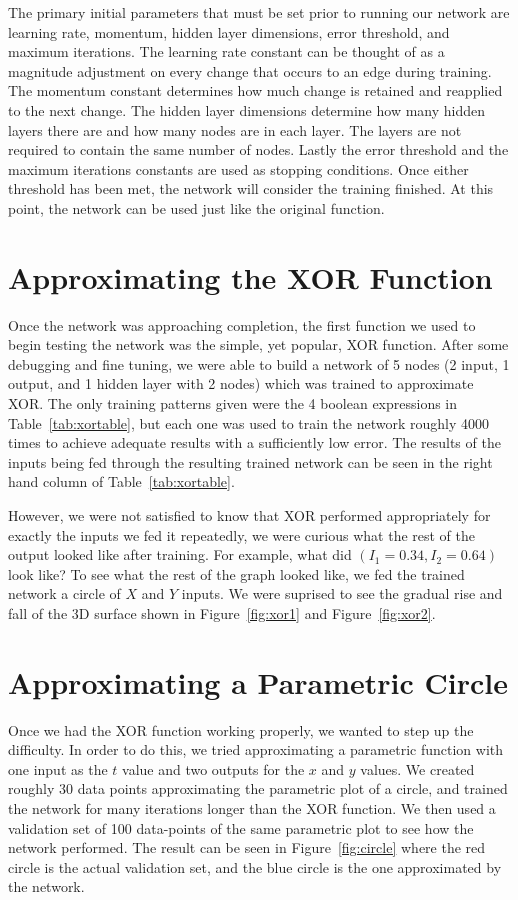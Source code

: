 \documentclass{article}
\begin{document}
\begin{multicols}{2}
The primary initial parameters that must be set prior to running our network are learning rate, momentum, hidden layer dimensions, error threshold, and maximum iterations. The learning rate constant can be thought of as a magnitude adjustment on every change that occurs to an edge during training. The momentum constant determines how much change is retained and reapplied to the next change. The hidden layer dimensions determine how many hidden layers there are and how many nodes are in each layer. The layers are not required to contain the same number of nodes. Lastly the error threshold and the maximum iterations constants are used as stopping conditions. Once either threshold has been met, the network will consider the training finished. At this point, the network can be used just like the original function.

\section{Approximating the XOR Function}

Once the network was approaching completion, the first function we used to begin testing the network was the simple, yet popular, XOR function. After some debugging and fine tuning, we were able to build a network of 5 nodes (2 input, 1 output, and 1 hidden layer with 2 nodes) which was trained to approximate XOR. The only training patterns given were the 4 boolean expressions in Table~\ref{tab:xortable}, but each one was used to train the network roughly 4000 times to achieve adequate results with a sufficiently low error. The results of the inputs being fed through the resulting trained network can be seen in the right hand column of Table~\ref{tab:xortable}.

However, we were not satisfied to know that XOR performed appropriately for exactly the inputs we fed it repeatedly, we were curious what the rest of the output looked like after training. For example, what did $(I_1=0.34, I_2=0.64)$ look like? To see what the rest of the graph looked like, we fed the trained network a circle of $X$ and $Y$ inputs. We were suprised to see the gradual rise and fall of the 3D surface shown in Figure~\ref{fig:xor1} and Figure~\ref{fig:xor2}.

\section{Approximating a Parametric Circle}

Once we had the XOR function working properly, we wanted to step up the difficulty. In order to do this, we tried approximating a parametric function with one input as the $t$ value and two outputs for the $x$ and $y$ values. We created roughly 30 data points approximating the parametric plot of a circle, and trained the network for many iterations longer than the XOR function. We then used a validation set of 100 data-points of the same parametric plot to see how the network performed. The result can be seen in Figure~\ref{fig:circle} where the red circle is the actual validation set, and the blue circle is the one approximated by the network.


\end{multicols}
\end{document}
